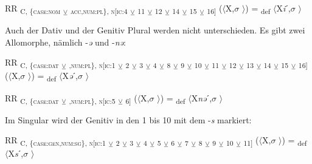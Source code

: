 \ea%
\label{ex:key:80}
 RR \textsubscript{C, \{\textsc{case:nom}} \textsubscript{\tiny $\veebar$}\textsubscript{ \textsc{acc},\textsc{num:pl}\}, \textsc{n[}\textsc{ic:}4} \textsubscript{\tiny $\veebar$}\textsubscript{ 11} \textsubscript{\tiny $\veebar$}\textsubscript{ 12} \textsubscript{\tiny $\veebar$}\textsubscript{ 14} \textsubscript{\tiny $\veebar$}\textsubscript{ 15} \textsubscript{\tiny $\veebar$}\textsubscript{ 16]} ($\langle$X,$\sigma$ $\rangle$) = \textsubscript{def} $\langle$X\textit{i}ˊ,$\sigma$ $\rangle$
\z

Auch der Dativ und der Genitiv Plural werden nicht unterschieden. Es gibt zwei Allomorphe, nämlich -\textit{ə} und -\textit{nə}:

\ea%
\label{ex:key:81}
 RR \textsubscript{C, \{\textsc{case:dat}} \textsubscript{\tiny $\veebar$}\textsubscript{ \GEN,\textsc{num:pl}\}, \textsc{n[}\textsc{ic:}1} \textsubscript{\tiny $\veebar$}\textsubscript{ 2} \textsubscript{\tiny $\veebar$}\textsubscript{ 3} \textsubscript{\tiny $\veebar$}\textsubscript{ 4} \textsubscript{\tiny $\veebar$}\textsubscript{ 8} \textsubscript{\tiny $\veebar$}\textsubscript{ 9} \textsubscript{\tiny $\veebar$}\textsubscript{ 10} \textsubscript{${\veebar}$}\textsubscript{ 11} \textsubscript{${\veebar}$}\textsubscript{ 12} \textsubscript{${\veebar}$}\textsubscript{ 13} \textsubscript{${\veebar}$}\textsubscript{ 14} \textsubscript{${\veebar}$}\textsubscript{ 15} \textsubscript{${\veebar}$}\textsubscript{ 16]} ($\langle$X,$\sigma$ $\rangle$) = \textsubscript{def} $\langle$X\textit{ə}ˊ,$\sigma$ $\rangle$
\z

\ea%
\label{ex:key:82}
 RR \textsubscript{C, \{\textsc{case:dat}} \textsubscript{\tiny $\veebar$}\textsubscript{ \GEN,\textsc{num:pl}\}, \textsc{n[}\textsc{ic:}5} \textsubscript{\tiny $\veebar$}\textsubscript{ 6]} ($\langle$X,$\sigma$ $\rangle$) = \textsubscript{def} $\langle$X\textit{nə}ˊ,$\sigma$ $\rangle$
\z

Im Singular wird der Genitiv in den  1 bis 10 mit dem  -\textit{s} markiert:

\ea%
\label{ex:key:83}
 RR \textsubscript{C, \{\textsc{case:gen},\textsc{num:sg}\}, \textsc{n[}\textsc{ic:}1} \textsubscript{\tiny $\veebar$}\textsubscript{ 2} \textsubscript{\tiny $\veebar$}\textsubscript{ 3} \textsubscript{\tiny $\veebar$}\textsubscript{ 4} \textsubscript{\tiny $\veebar$}\textsubscript{ 5} \textsubscript{\tiny $\veebar$}\textsubscript{ 6} \textsubscript{\tiny $\veebar$}\textsubscript{ 7} \textsubscript{\tiny $\veebar$}\textsubscript{ 8} \textsubscript{${\veebar}$}\textsubscript{ 9} \textsubscript{${\veebar}$}\textsubscript{ 10} \textsubscript{${\veebar}$}\textsubscript{ 11]} ($\langle$X,$\sigma$ $\rangle$) = \textsubscript{def} $\langle$X\textit{s}ˊ,$\sigma$ $\rangle$\\
\z

